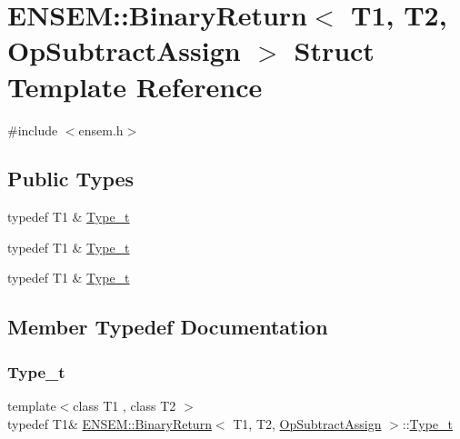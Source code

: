 \hypertarget{structENSEM_1_1BinaryReturn_3_01T1_00_01T2_00_01OpSubtractAssign_01_4}{}\section{E\+N\+S\+EM\+:\+:Binary\+Return$<$ T1, T2, Op\+Subtract\+Assign $>$ Struct Template Reference}
\label{structENSEM_1_1BinaryReturn_3_01T1_00_01T2_00_01OpSubtractAssign_01_4}


{\ttfamily \#include $<$ensem.\+h$>$}

\subsection*{Public Types}
\begin{DoxyCompactItemize}
\item 
typedef T1 \& \mbox{\hyperlink{structENSEM_1_1BinaryReturn_3_01T1_00_01T2_00_01OpSubtractAssign_01_4_a21f38c2ce7ac4f73a438d38f65705fe7}{Type\+\_\+t}}
\item 
typedef T1 \& \mbox{\hyperlink{structENSEM_1_1BinaryReturn_3_01T1_00_01T2_00_01OpSubtractAssign_01_4_a21f38c2ce7ac4f73a438d38f65705fe7}{Type\+\_\+t}}
\item 
typedef T1 \& \mbox{\hyperlink{structENSEM_1_1BinaryReturn_3_01T1_00_01T2_00_01OpSubtractAssign_01_4_a21f38c2ce7ac4f73a438d38f65705fe7}{Type\+\_\+t}}
\end{DoxyCompactItemize}


\subsection{Member Typedef Documentation}
\mbox{\label{structENSEM_1_1BinaryReturn_3_01T1_00_01T2_00_01OpSubtractAssign_01_4_a21f38c2ce7ac4f73a438d38f65705fe7}} 
\subsubsection{\texorpdfstring{Type\_t}{Type\_t}\hspace{0.1cm}{\footnotesize\ttfamily [1/3]}}
{\footnotesize\ttfamily template$<$class T1 , class T2 $>$ \\
typedef T1\& \mbox{\hyperlink{structENSEM_1_1BinaryReturn}{E\+N\+S\+E\+M\+::\+Binary\+Return}}$<$ T1, T2, \mbox{\hyperlink{structENSEM_1_1OpSubtractAssign}{Op\+Subtract\+Assign}} $>$\+::\mbox{\hyperlink{structENSEM_1_1BinaryReturn_3_01T1_00_01T2_00_01OpSubtractAssign_01_4_a21f38c2ce7ac4f73a438d38f65705fe7}{Type\+\_\+t}}}

